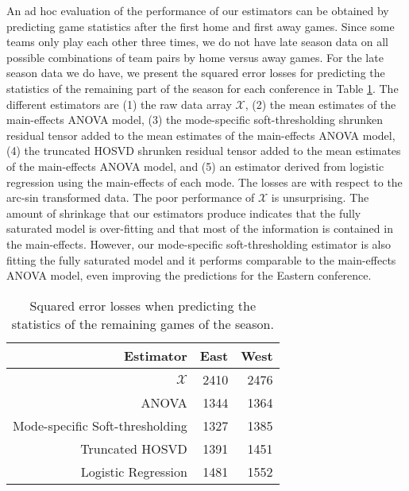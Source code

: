 An ad hoc evaluation of the performance of our estimators can be obtained by predicting game statistics after the first home and first away games. Since some teams only play each other three times, we do not have late season data on all possible combinations of team pairs by home versus away games. For the late season data we do have, we present the squared error losses for predicting the statistics of the remaining part of the season for each conference in Table \ref{tab:sel.nba}. The different estimators are (1) the raw data array $\mathcal{X}$, (2) the mean estimates of the main-effects ANOVA model, (3) the mode-specific soft-thresholding shrunken residual tensor added to the mean estimates of the main-effects ANOVA model, (4) the truncated HOSVD shrunken residual tensor added to the mean estimates of the main-effects ANOVA model, and (5) an estimator derived from logistic regression using the main-effects of each mode. The losses are with respect to the arc-sin transformed data. The poor performance of $\mathcal{X}$ is unsurprising. The amount of shrinkage that our estimators produce indicates that the fully saturated model is over-fitting and that most of the information is contained in the main-effects. However, our mode-specific soft-thresholding estimator is also fitting the fully saturated model and it performs comparable to the main-effects ANOVA model, even improving the predictions for the Eastern conference.


\begin{table}[ht]
  \centering
  \begin{tabular}{rrr}
    Estimator & East & West\\
    \hline
    $\mathcal{X}$ & 2410 & 2476\\
    ANOVA & 1344 & 1364 \\
    Mode-specific Soft-thresholding & 1327 & 1385 \\
    Truncated HOSVD & 1391 & 1451\\
    Logistic Regression & 1481 & 1552\\
  \end{tabular}
  \caption{Squared error losses when predicting the statistics of the remaining games of the season.}
  \label{tab:sel.nba}
\end{table}

